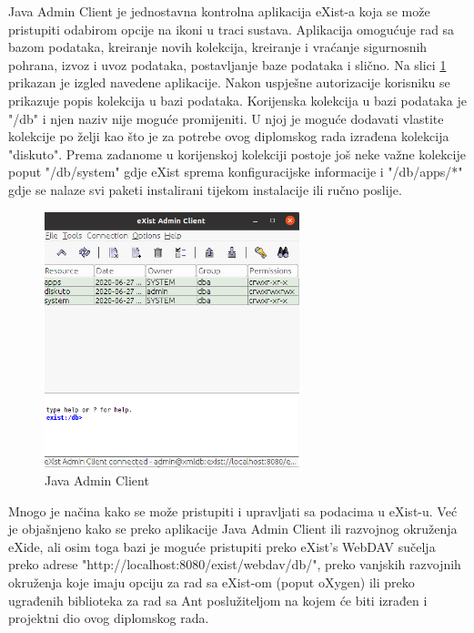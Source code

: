 \documentclass{foi}
\begin{document}
Java Admin Client je jednostavna kontrolna aplikacija eXist-a koja se može pristupiti odabirom opcije na ikoni u traci sustava. Aplikacija omogućuje rad sa bazom podataka, kreiranje novih kolekcija, kreiranje i vraćanje sigurnosnih pohrana, izvoz i uvoz podataka, postavljanje baze podataka i slično. Na slici \ref{javaAdminClient} prikazan je izgled navedene aplikacije. Nakon uspješne autorizacije korisniku se prikazuje popis kolekcija u bazi podataka. Korijenska kolekcija u bazi podataka je "/db" i njen naziv nije moguće promijeniti. U njoj je moguće dodavati vlastite kolekcije po želji kao što je za potrebe ovog diplomskog rada izrađena kolekcija "diskuto". Prema zadanome u korijenskoj kolekciji postoje još neke važne kolekcije poput "/db/system" gdje eXist sprema konfiguracijske informacije i "/db/apps/*" gdje se nalaze svi paketi instalirani tijekom instalacije ili ručno poslije.

\begin{figure}[h!]
    \centering
    \includegraphics[width=0.66\textwidth]{slike/javaAdminClient.png}
    \caption{Java Admin Client}
    \label{javaAdminClient}
\end{figure}

Mnogo je načina kako se može pristupiti i upravljati sa podacima u eXist-u. Već je objašnjeno kako se preko aplikacije Java Admin Client ili razvojnog okruženja eXide, ali osim toga bazi je moguće pristupiti preko  eXist's WebDAV sučelja preko adrese "http://localhost:8080/exist/webdav/db/", preko vanjskih razvojnih okruženja koje imaju opciju za rad sa eXist-om (poput oXygen) ili preko ugrađenih biblioteka za rad sa Ant poslužiteljom na kojem će biti izrađen i projektni dio ovog diplomskog rada.
\end{document}
